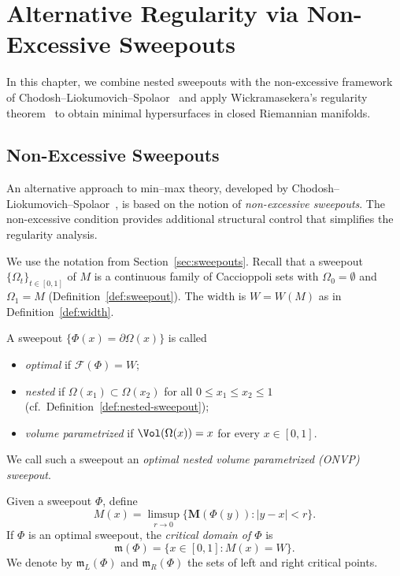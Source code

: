 \chapter{Alternative Regularity via Non-Excessive Sweepouts}\label{ch:alternative-regularity}

In this chapter, we combine nested sweepouts with the non-excessive framework of Chodosh--Liokumovich--Spolaor~\cite{CLS22} and apply Wickramasekera's regularity theorem~\cite{Wic14} to obtain minimal hypersurfaces in closed Riemannian manifolds.

\section{Non-Excessive Sweepouts}\label{sec:non-excessive-prelim}
An alternative approach to min--max theory, developed by Chodosh--Liokumovich--Spolaor~\cite{CLS22}, is based on the notion of \emph{non-excessive sweepouts}. The non-excessive condition provides additional structural control that simplifies the regularity analysis.

We use the notation from Section~\ref{sec:sweepouts}. Recall that a sweepout $\{\Omega_t\}_{t\in[0,1]}$ of $M$ is a continuous family of Caccioppoli sets with $\Omega_0 = \emptyset$ and $\Omega_1 = M$ (Definition~\ref{def:sweepout}). The width is $W = W(M)$ as in Definition~\ref{def:width}.

\begin{definition}\label{def:onvp}
A sweepout $\{\Phi(x) = \partial \Omega(x)\}$ is called
\begin{itemize}
    \item \emph{optimal} if $\mathcal{F}(\Phi) = W$;
    \item \emph{nested} if $\Omega(x_1) \subset \Omega(x_2)$ for all $0\leq x_1 \leq x_2\leq 1$ (cf.\ Definition~\ref{def:nested-sweepout});
    \item \emph{volume parametrized} if $\Vol(\Omega(x)) = x$ for every $x\in [0,1]$.
\end{itemize}
We call such a sweepout an \emph{optimal nested volume parametrized (ONVP) sweepout}.
\end{definition}

\begin{definition}\label{def:critical-set}
Given a sweepout $\Phi$, define
\[
M(x) = \limsup_{r \to 0} \{\mathbf{M}(\Phi(y)): |y-x| < r\}.
\]
If $\Phi$ is an optimal sweepout, the \emph{critical domain of $\Phi$} is
\[
\mathfrak{m}(\Phi)=\{ x \in [0,1]: M(x) =W \}.
\]
We denote by $\mathfrak{m}_L(\Phi)$ and $\mathfrak{m}_R(\Phi)$ the sets of left and right critical points.
\end{definition}

